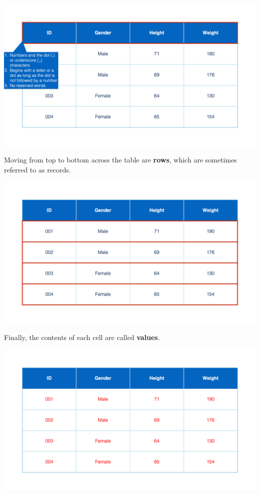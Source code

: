 \documentclass[
  letterpaper,
  DIV=11,
  numbers=noendperiod]{scrreprt}
\begin{document}
\includegraphics{chapters/what_is_r/table_column_name.png}

Moving from top to bottom across the table are \textbf{rows}, which are
sometimes referred to as records.

\includegraphics{chapters/what_is_r/table_rows.png}

Finally, the contents of each cell are called \textbf{values}.

\includegraphics{chapters/what_is_r/table_values.png}
\end{document}
